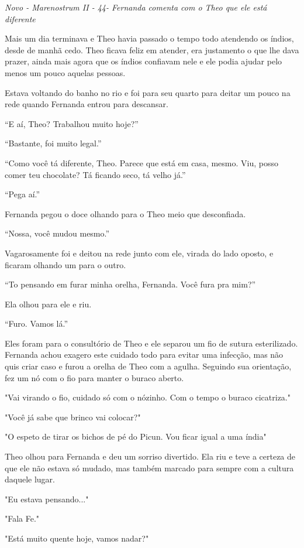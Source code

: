 \asterisc

\emph{Novo - Marenostrum II - 44- Fernanda comenta com o Theo que ele
está diferente}

Mais um dia terminava e Theo havia passado o tempo todo atendendo os
índios, desde de manhã cedo. Theo ficava feliz em atender, era
justamento o que lhe dava prazer, ainda mais agora que os índios
confiavam nele e ele podia ajudar pelo menos um pouco aquelas pessoas.

Estava voltando do banho no rio e foi para seu quarto para deitar um
pouco na rede quando Fernanda entrou para descansar.

``E aí, Theo? Trabalhou muito hoje?''

``Bastante, foi muito legal.''

``Como você tá diferente, Theo. Parece que está em casa, mesmo. Viu,
posso comer teu chocolate? Tá ficando seco, tá velho já.''

``Pega aí.''

Fernanda pegou o doce olhando para o Theo meio que desconfiada.

``Nossa, você mudou mesmo.''

Vagarosamente foi e deitou na rede junto com ele, virada do lado oposto,
e ficaram olhando um para o outro.

``To pensando em furar minha orelha, Fernanda. Você fura pra mim?''

Ela olhou para ele e riu.

``Furo. Vamos lá.''

Eles foram para o consultório de Theo e ele separou um fio de sutura
esterilizado. Fernanda achou exagero este cuidado todo para evitar uma
infecção, mas não quis criar caso e furou a orelha de Theo com a agulha.
Seguindo sua orientação, fez um nó com o fio para manter o buraco
aberto.

"Vai virando o fio, cuidado só com o nózinho. Com o tempo o buraco
cicatriza."

"Você já sabe que brinco vai colocar?"

"O espeto de tirar os bichos de pé do Picun. Vou ficar igual a uma
índia"

Theo olhou para Fernanda e deu um sorriso divertido. Ela riu e teve a
certeza de que ele não estava só mudado, mas também marcado para sempre
com a cultura daquele lugar.

"Eu estava pensando..."

"Fala Fe."

"Está muito quente hoje, vamos nadar?"

